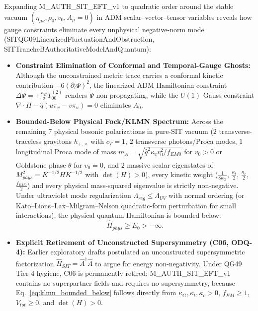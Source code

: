 \documentclass[american,11pt,letterpaper]{article}
\def\mathbf#1{#1}%
\def\mathrm#1{#1}%
\def\texttt#1{#1}%
\begin{document}
Expanding \texttt{M\_AUTH\_SIT\_EFT\_v1} to quadratic order around the stable vacuum $(\eta_{\mu\nu}, \rho_0, v_0, A_\mu = 0)$ in ADM scalar--vector--tensor variables reveals how gauge constraints eliminate every unphysical negative-norm mode (\texttt{SITQG09LinearizedFluctuationAndObstruction}, \texttt{SITTrancheBAuthoritativeModelAndQuantum}):
\begin{itemize}
  \item \textbf{Constraint Elimination of Conformal and Temporal-Gauge Ghosts:} Although the unconstrained metric trace carries a conformal kinetic contribution $-6(\partial_t\Psi)^2$, the linearized ADM Hamiltonian constraint $\Delta\Psi = +\frac{\kappa_G}{2}T_{00}^{(2)}$ renders $\Psi$ non-propagating, while the $U(1)$ Gauss constraint $\nabla\cdot\mathbf{\Pi} - \hat{q}(u\pi_v - v\pi_u) = 0$ eliminates $A_0$.
  \item \textbf{Bounded-Below Physical Fock/KLMN Spectrum:} Across the remaining $7$ physical bosonic polarizations in pure-SIT vacuum ($2$ transverse-traceless gravitons $h_{+,\times}$ with $c_T = 1$, $2$ transverse photons/Proca modes, $1$ longitudinal Proca mode of mass $m_A = \sqrt{\hat{q}^2\kappa_c v_0^2 / f_{\mathrm{EM}0}}$ for $v_0 > 0$ or Goldstone phase $\theta$ for $v_0 = 0$, and $2$ massive scalar eigenstates of $M_{\mathrm{phys}}^2 = K^{-1/2} H K^{-1/2}$ with $\det(H) > 0$), every kinetic weight ($\frac{1}{8\kappa_G}$, $\frac{\kappa_t}{2}$, $\frac{\kappa_c}{2}$, $\frac{f_{\mathrm{EM}0}}{2}$) and every physical mass-squared eigenvalue is strictly non-negative. Under ultraviolet mode regularization $\Lambda_{\mathrm{reg}} \le \Lambda_{\mathrm{UV}}$ with normal ordering (or Kato--Lions--Lax--Milgram--Nelson quadratic-form perturbation for small interactions), the physical quantum Hamiltonian is bounded below:
  \begin{equation}
  \hat{H}_{\mathrm{phys}} \ge E_0 > -\infty.
  \label{eq:klmn_bounded_below}
  \end{equation}
  \item \textbf{Explicit Retirement of Unconstructed Supersymmetry (\texttt{C06}, \texttt{ODQ-4}):} Earlier exploratory drafts postulated an unconstructed supersymmetric factorization $\hat{H}_{\mathrm{SIT}} = \hat{A}^\dagger\hat{A}$ to argue for energy non-negativity. Under \texttt{QG49} Tier-4 hygiene, \texttt{C06} is permanently retired: \texttt{M\_AUTH\_SIT\_EFT\_v1} contains no superpartner fields and requires no supersymmetry, because Eq.~\eqref{eq:klmn_bounded_below} follows directly from $\kappa_G, \kappa_t, \kappa_c > 0$, $f_{\mathrm{EM}} \ge 1$, $V_{\mathrm{tot}} \ge 0$, and $\det(H) > 0$.
\end{itemize}
\end{document}
